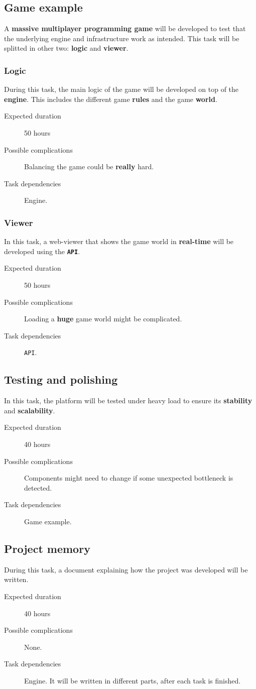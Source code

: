 \documentclass[a4paper,11pt,titlepage,abstract,numbers=noenddot,automark,mnsy,intlimits,rgb,dvipsnames]{report}
\begin{document}
\subsection{Game example}
A \textbf{massive multiplayer programming game} will be developed to test that the underlying
engine and infrastructure work as intended. This task will be splitted in other two: \textbf{logic} and \textbf{viewer}.
\subsubsection{Logic}
During this task, the main logic of the game will be developed on top of the \textbf{engine}.
This includes the different game \textbf{rules} and the game \textbf{world}.
\begin{description}
\item[Expected duration]
50 hours
\item[Possible complications]
Balancing the game could be \textbf{really} hard.
\item[Task dependencies]
Engine.
\end{description}
\subsubsection{Viewer}
In this task, a web-viewer that shows the game world in \textbf{real-time} will be developed using the \textbf{\texttt{API}}.
\begin{description}
\item[Expected duration]
50 hours
\item[Possible complications]
Loading a \textbf{huge} game world might be complicated.
\item[Task dependencies]
\texttt{API}.
\end{description}
\subsection{Testing and polishing}
In this task, the platform will be tested under heavy load to ensure its \textbf{stability} and \textbf{scalability}.
\begin{description}
\item[Expected duration]
40 hours
\item[Possible complications]
Components might need to change if some unexpected bottleneck is detected.
\item[Task dependencies]
Game example.
\end{description}
\subsection{Project memory}
During this task, a document explaining how the project was developed will be written.
\begin{description}
\item[Expected duration]
40 hours
\item[Possible complications]
None.
\item[Task dependencies]
Engine. It will be written in different parts, after each task is finished.
\end{description}
\end{document}
